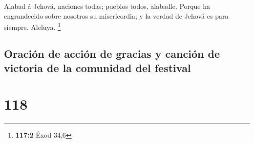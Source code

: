  Alabad á Jehová, naciones todas; pueblos todos, alabadle.
 Porque ha engrandecido sobre nosotros su misericordia; y la
verdad de Jehová es para siempre. Aleluya. \footnote{\textbf{117:2} Éxod
  34,6}

\hypertarget{oraciuxf3n-de-acciuxf3n-de-gracias-y-canciuxf3n-de-victoria-de-la-comunidad-del-festival}{%
\subsection{Oración de acción de gracias y canción de victoria de la
comunidad del
festival}\label{oraciuxf3n-de-acciuxf3n-de-gracias-y-canciuxf3n-de-victoria-de-la-comunidad-del-festival}}

\hypertarget{section-117}{%
\section{118}\label{section-117}}

